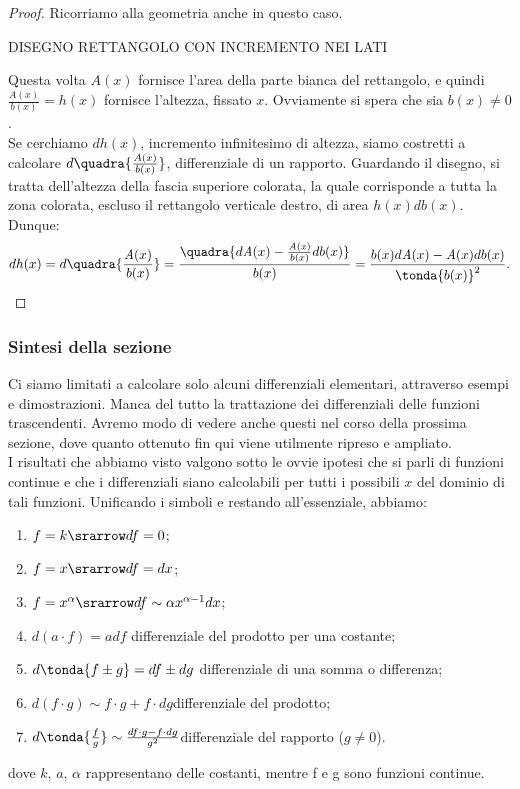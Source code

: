 \begin{proof}
Ricorriamo alla geometria anche in questo caso.


DISEGNO RETTANGOLO CON INCREMENTO NEI LATI


Questa volta $\mathit{A}(x)$ fornisce l'area della parte bianca del rettangolo, e quindi
$\frac{A(x)}{b(x)}=h(x)$ fornisce l'altezza, fissato $x$. Ovviamente si spera che 
sia $b(x)\neq 0$.\\
Se cerchiamo $dh(x)$, incremento infinitesimo di altezza, siamo costretti a calcolare
$d\quadra{\frac{A(x)}{b(x)}}$, differenziale di un rapporto. Guardando il disegno,
si tratta dell'altezza della fascia superiore colorata, la quale corrisponde a
tutta la zona colorata, escluso il rettangolo verticale destro, di area $h(x)db(x)$.
Dunque:
\begin{align*}
 dh(x)=d\quadra{\frac{\mathit{A}(x)}{b(x)}}=\frac{\quadra{d\mathit{A}(x)-
 \frac{\mathit{A(x)}}{b(x)}db(x)}}{b(x)}=
 \frac{b(x)d\mathit{A}(x)-\mathit{A}(x)db(x)}{\tonda{b(x)}^2}.
\end{align*}
\end{proof}


\subsubsection{Sintesi della sezione}
\label{subsubsec:diff01_diffsint}
Ci siamo limitati a calcolare solo alcuni differenziali elementari, attraverso esempi 
e dimostrazioni. Manca del tutto la trattazione dei differenziali delle
funzioni trascendenti. Avremo modo di vedere anche questi nel corso della prossima
sezione, dove quanto ottenuto fin qui viene utilmente ripreso e ampliato.\\
\newline
I risultati che abbiamo visto valgono sotto le ovvie ipotesi
che si parli di funzioni continue e che i differenziali siano calcolabili
per tutti i possibili $x$ del dominio di tali funzioni. Unificando i simboli e restando
all'essenziale, abbiamo:
\begin{enumerate} [noitemsep]
 \item $f=k \srarrow df=0$;
 \item $f=x \srarrow df=dx$;
 \item $f=x^\alpha \srarrow df\sim\alpha x^{\alpha-1}dx$;\newline
 \item $d(a\cdot f)=adf$ \tab differenziale del prodotto per una costante;
 \item $d\tonda{f\pm g}=df\pm dg$ \tab differenziale di una somma o differenza;
 \item $d(f\cdot g)\sim f\cdot g+f\cdot dg$\tab differenziale del prodotto;
 \item $d\tonda{\frac{f}{g}}\sim\frac{df\cdot g-f\cdot dg}{g^2}$\tab  differenziale 
 del rapporto (\(g\ne0\)).
\end{enumerate}
dove  $k$, $a$, $\alpha$ rappresentano delle costanti, mentre f e g sono funzioni continue. 


